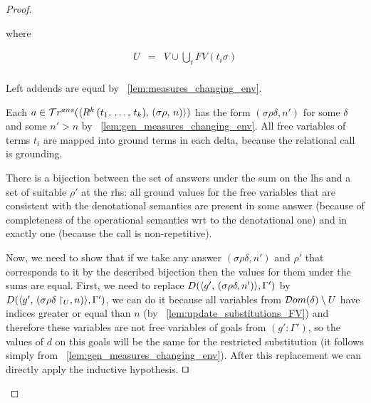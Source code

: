 \begin{proof}
\begin{enumerate}
\begin{enumerate}
    where
    
    \[ \begin{array}{lcl}
    U & = &  V \cup \bigcup_{i} FV(t_i \sigma) \\
    \end{array} \]
    
    Left addends are equal by \lemmaword~\ref{lem:measures_changing_env}.
    
    Each $a \in \mathcal{T}r^{ans}(\langle R^k\,(t_1, \, \dots, \, t_k) ,\, (\sigma\rho ,\, n) \rangle)$ has the form $(\sigma \rho \delta, n')$ for some $\delta$ and some $n' > n$ by \lemmaword~\ref{lem:gen_measures_changing_env}. All free variables of terms $t_i$ are mapped into ground terms in each delta, because the relational call is grounding.
    
    There is a bijection between the set of answers under the sum on the lhs and a set of suitable $\rho'$ at the rhs: all ground values for the free variables that are consistent with the denotational semantics are present in some answer (because of completeness of the operational semantics wrt to the denotational one) and in exactly one (because the call is non-repetitive).
    
    Now, we need to show that if we take any answer $(\sigma \rho \delta, n')$ and $\rho'$ that corresponds to it by the described bijection then the values for them under the sums are equal. First, we need to replace $D(\langle g' ,\, (\sigma \rho \delta, n') \rangle, \Gamma')$ by $D(\langle g' ,\, (\sigma \rho \delta\restriction_U, n) \rangle, \Gamma')$, we can do it because all variables from $\mathcal{D}om(\delta) \setminus U$ have indices greater or equal than $n$ (by \lemmaword~\ref{lem:update_substitutions_FV}) and therefore these variables are not free variables of goals from $(g' : \Gamma')$, so the values of $d$ on this goals will be the same for the restricted substitution (it follows simply from \lemmaword~\ref{lem:gen_measures_changing_env}). After this replacement we can directly apply the inductive hypothesis. $\qed$
	
	\end{enumerate}


\end{enumerate}
\end{proof}
